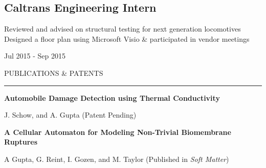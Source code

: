 \documentclass[letterpaper,10pt,oneside]{article}
\begin{document}
\begin{body}

\section
{\textbf{Caltrans}
\newline
Engineering Intern
\newline
}

\BulletItem
\vspace{-2.5ex}
\begin{detail}
\BulletItem
Reviewed and advised on structural testing for next generation locomotives
\BulletItem
Designed a floor plan using Microsoft Visio \& participated in vendor meetings
\end{detail}

\begin{subtitle}
\vspace{-7.8ex}
{{Jul 2015 - Sep 2015}}
\end{subtitle}
\vspace{3ex}

{
\hspace{-1.72in}\noindent\color{cblue}
{PUBLICATIONS \& PATENTS} %
}

\vspace{-1.6ex}
{\hspace{-1.73in}\noindent\color{dblue}\rule{6.935in}{0.4pt}} %
\vspace{-2ex}

{\hspace{-1.76in}\fontsize{9}{1}
\textbf{Automobile Damage Detection using Thermal Conductivity}}

{\hspace{-1.76in}\fontsize{9}{1}
{J. Schow, and A. Gupta (Patent Pending)}
}

\vspace{1ex}

{\hspace{-1.76in}\fontsize{9}{1}
\textbf{A Cellular Automaton for Modeling Non-Trivial Biomembrane Ruptures}
}

{\hspace{-1.76in}\fontsize{9}{1} 
{A Gupta, G. Reint, I. Gozen, and M. Taylor (Published in \textit{Soft Matter})}}
\vspace{3ex}



\end{body}
\end{document}
